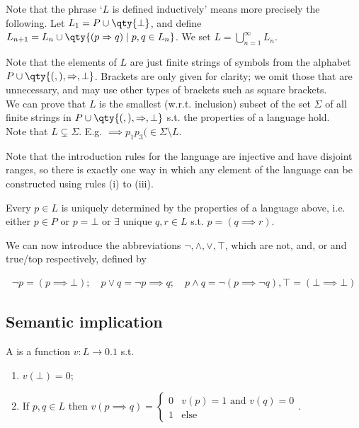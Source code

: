 \begin{remark}
    Note that the phrase `$L$ is defined inductively' means more precisely the following.
    Let $L_1 = P \cup \qty{\bot}$, and define $L_{n+1} = L_n \cup \qty{(p \implies q) \mid p, q \in L_n}$.
    We set $L = \bigcup_{n=1}^\infty L_n$.

    Note that the elements of $L$ are just finite strings of symbols from the alphabet $P \cup \qty{(, ), \implies, \bot}$.
    Brackets are only given for clarity; we omit those that are unnecessary, and may use other types of brackets such as square brackets. \\
    We can prove that $L$ is the smallest (w.r.t. inclusion) subset of the set $\Sigma$ of all finite strings in $P \cup \qty{(, ), \implies, \bot}$ s.t. the properties of a language hold. \\
    Note that $L \subsetneq \Sigma$. E.g. $\implies p_1 p_3 ( \in \Sigma \setminus L$.

    Note that the introduction rules for the language are injective and have disjoint ranges, so there is exactly one way in which any element of the language can be constructed using rules (i) to (iii).

    Every $p \in L$ is uniquely determined by the properties of a language above, i.e. either $p \in P$ or $p = \bot$ or $\exists$ unique $q, r \in L$ s.t. $p = (q \implies r)$.
\end{remark}

We can now introduce the abbreviations $\neg, \wedge, \vee, \top$, which are not, and, or and true/top respectively, defined by
\begin{notation}
    \begin{align*}
        \neg p = (p \implies \bot);\quad p \vee q = \neg p \implies q;\quad p \wedge q = \neg (p \implies \neg q), \top = (\bot \implies \bot)
    \end{align*}
\end{notation}

\subsection{Semantic implication}
\begin{definition}[Valuation]
    A  is a function $v \colon L \to \qty{0,1}$ s.t.
    \begin{enumerate}
        \item $v(\bot) = 0$;
        \item If $p, q \in L$ then
        $v(p \implies q) = \begin{cases}
            0 & v(p) = 1 \text{ and } v(q) = 0 \\
            1 & \text{else}
        \end{cases}$.
    \end{enumerate}
\end{definition}

